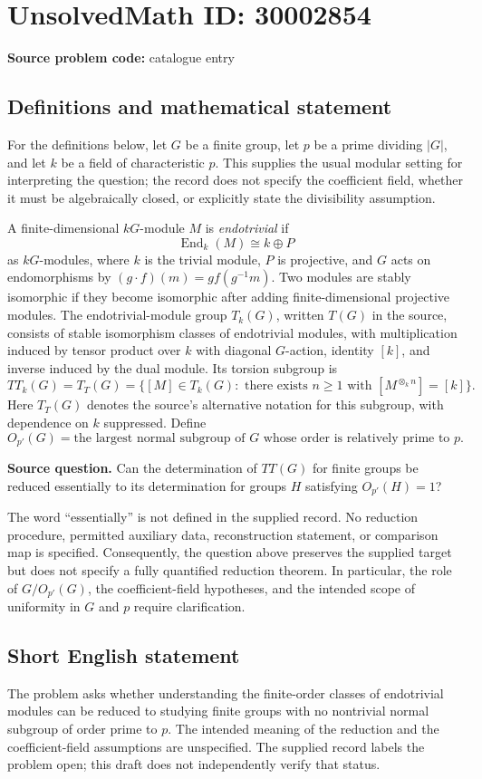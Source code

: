 \documentclass[11pt]{article}
\begin{document}
\section*{UnsolvedMath ID: 30002854}
\textbf{Source problem code:} catalogue entry
\subsection{Definitions and mathematical statement}
For the definitions below, let \(G\) be a finite group, let \(p\) be a prime dividing \(|G|\), and let \(k\) be a field of characteristic \(p\). This supplies the usual modular setting for interpreting the question; the record does not specify the coefficient field, whether it must be algebraically closed, or explicitly state the divisibility assumption.

A finite-dimensional \(kG\)-module \(M\) is \emph{endotrivial} if
\[
\operatorname{End}_k(M)\cong k\oplus P
\]
as \(kG\)-modules, where \(k\) is the trivial module, \(P\) is projective, and \(G\) acts on endomorphisms by \((g\cdot f)(m)=g f(g^{-1}m)\). Two modules are stably isomorphic if they become isomorphic after adding finite-dimensional projective modules. The endotrivial-module group \(T_k(G)\), written \(T(G)\) in the source, consists of stable isomorphism classes of endotrivial modules, with multiplication induced by tensor product over \(k\) with diagonal \(G\)-action, identity \([k]\), and inverse induced by the dual module. Its torsion subgroup is
\[
TT_k(G)=T_T(G)=\bigl\{[M]\in T_k(G):\text{ there exists }n\geq 1\text{ with }[M^{\otimes_k n}]=[k]\bigr\}.
\]
Here \(T_T(G)\) denotes the source's alternative notation for this subgroup, with dependence on \(k\) suppressed. Define
\[
O_{p'}(G)=\text{the largest normal subgroup of }G\text{ whose order is relatively prime to }p.
\]

\textbf{Source question.} Can the determination of \(TT(G)\) for finite groups be reduced essentially to its determination for groups \(H\) satisfying \(O_{p'}(H)=1\)?

The word ``essentially'' is not defined in the supplied record. No reduction procedure, permitted auxiliary data, reconstruction statement, or comparison map is specified. Consequently, the question above preserves the supplied target but does not specify a fully quantified reduction theorem. In particular, the role of \(G/O_{p'}(G)\), the coefficient-field hypotheses, and the intended scope of uniformity in \(G\) and \(p\) require clarification.
\subsection{Short English statement}
The problem asks whether understanding the finite-order classes of endotrivial modules can be reduced to studying finite groups with no nontrivial normal subgroup of order prime to \(p\). The intended meaning of the reduction and the coefficient-field assumptions are unspecified. The supplied record labels the problem open; this draft does not independently verify that status.
\end{document}
